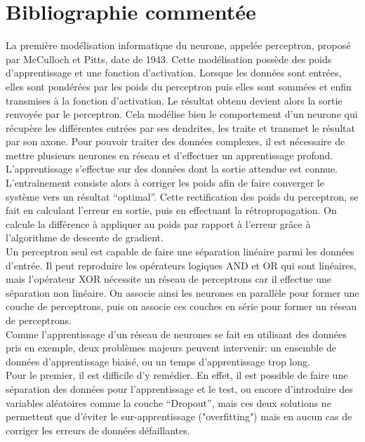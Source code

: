 \documentclass[12pt,a4paper, french]{article}
\begin{document}
\section*{Bibliographie commentée}
La première modélisation informatique du neurone, appelée perceptron, proposé par McCulloch et Pitts, date de 1943. Cette modélisation possède des poids d'apprentissage et une fonction d’activation. Lorsque les données sont entrées, elles sont pondérées par les poids du perceptron puis elles sont sommées et enfin transmises à la fonction d’activation. Le résultat obtenu devient alors la sortie renvoyée par le perceptron. Cela modélise bien le comportement d’un neurone qui récupère les différentes entrées par ses dendrites, les traite et transmet le résultat par son axone. Pour pouvoir traiter des données complexes, il est nécessaire de mettre plusieurs neurones en réseau et d'effectuer un apprentissage profond. \medskip
\\
L’apprentissage s'effectue sur des données dont la sortie attendue est connue. L’entraînement consiste alors à corriger les poids afin de faire converger le système vers un résultat “optimal”. Cette rectification des poids du perceptron, se fait en calculant l’erreur en sortie, puis en effectuant la rétropropagation. On calcule la différence à appliquer au poids par rapport à l'erreur grâce à l’algorithme de descente de gradient. \cite{3Blue1Brown} \medskip
\\
Un perceptron seul est capable de faire une séparation linéaire parmi les données d’entrée. Il peut reproduire les opérateurs logiques AND et OR qui sont linéaires, mais l'opérateur XOR nécessite un réseau de perceptrons car il effectue une séparation non linéaire. On associe ainsi les neurones en parallèle pour former une couche de perceptrons, puis on associe ces couches en série pour former un réseau de perceptrons. \cite{ann} \medskip
\\
Comme l’apprentissage d’un réseau de neurones se fait en utilisant des données pris en exemple, deux problèmes majeurs peuvent intervenir: un ensemble de données d’apprentissage biaisé, ou un temps d’apprentissage trop long. \\
Pour le premier, il est difficile d’y remédier. En effet, il est possible de faire une séparation des données pour l’apprentissage et le test, ou encore d’introduire des variables aléatoires comme la couche “Dropout”, mais ces deux solutions ne permettent que d’éviter le sur-apprentissage ("overfitting") mais en aucun cas de corriger les erreurs de données défaillantes. \\
\end{document}
